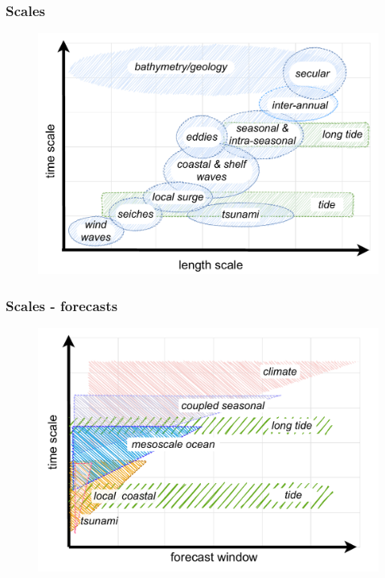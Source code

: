 \begin{frame}
\frametitle{Scales}
    \begin{figure}      
    \includegraphics[width=\textwidth]{figures/diagrams/scales_time_length.pdf}
    \end{figure}
\end{frame}
\begin{frame}
\frametitle{Scales - forecasts}
    \begin{figure}      
     \includegraphics[width=\textwidth]{figures/diagrams/scales.pdf}
    \end{figure} 
\end{frame}
